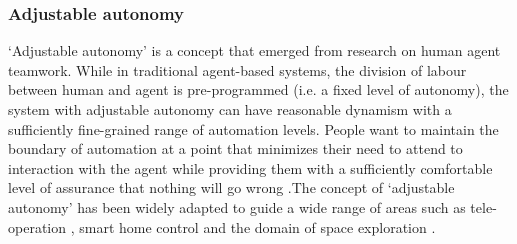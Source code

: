 
\subsubsection{Adjustable autonomy}
`Adjustable  autonomy' is a concept that emerged from research on human agent teamwork. While in traditional agent-based systems, the division of labour between human and agent is pre-programmed (i.e. a fixed level of autonomy),  the system with adjustable autonomy can have reasonable dynamism with a sufficiently fine-grained range of automation levels. People want to maintain the boundary of automation at a point that minimizes their need to attend to interaction with the agent while providing them with a sufficiently comfortable level of assurance that nothing will go wrong \citep{Bradshaw2003}.The concept of `adjustable autonomy' has been widely adapted to guide a wide range of areas such as tele-operation \citep{Schwarz2014,Goodrich2001a}, smart home control \citep{Costanza2014} and the domain of space exploration  \citep{Doraisa}. \\

